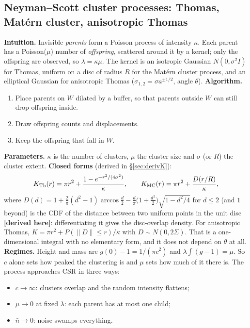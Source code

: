 \documentclass[10pt,a4paper]{article}
\newcommand{\derived}{\textcolor{green!45!black}{\textbf{[derived here]}}}
\newcommand{\nbar}{\bar n}
\begin{document}
\subsection{Neyman--Scott cluster processes: Thomas, Mat\'ern cluster, anisotropic Thomas}\label{sec:ns}
\textbf{Intuition.} Invisible \emph{parents} form a Poisson process of intensity $\kappa$. Each parent has a Poisson($\mu$) number of \emph{offspring}, scattered around it by a kernel; only the offspring are observed, so $\lambda=\kappa\mu$. The kernel is an isotropic Gaussian $N(0,\sigma^2I)$ for Thomas, uniform on a disc of radius $R$ for the Mat\'ern cluster process, and an elliptical Gaussian for anisotropic Thomas ($\sigma_{1,2}=\sigma a^{\pm1/2}$, angle $\theta$).
\textbf{Algorithm.}
\begin{enumerate}
  \item Place parents on $W$ dilated by a buffer, so that parents outside $W$ can still drop offspring inside.
  \item Draw offspring counts and displacements.
  \item Keep the offspring that fall in $W$.
\end{enumerate}
\textbf{Parameters.} $\kappa$ is the number of clusters, $\mu$ the cluster size and $\sigma$ (or $R$) the cluster extent.
\textbf{Closed forms} (derived in \S\ref{sec:derivK}):
\begin{equation}
K_{\rm Th}(r)=\pi r^2+\frac{1-e^{-r^2/(4\sigma^2)}}{\kappa},\qquad
K_{\rm MC}(r)=\pi r^2+\frac{D(r/R)}{\kappa},
\label{eq:Kns}
\end{equation}
where $D(d)=1+\tfrac{2}{\pi}(d^2-1)\arccos\tfrac d2-\tfrac d\pi\big(1+\tfrac{d^2}{2}\big)\sqrt{1-d^2/4}$ for $d\le2$ (and $1$ beyond) is the CDF of the distance between two uniform points in the unit disc \derived{}: differentiating it gives the disc-overlap density. For anisotropic Thomas, $K=\pi r^2+P(\|D\|\le r)/\kappa$ with $D\sim N(0,2\Sigma)$. That is a one-dimensional integral with no elementary form, and it does not depend on $\theta$ at all.
\textbf{Regimes.} Height and mass are $g(0)-1=1/(\pi c^2)$ and $\lambda\int(g-1)=\mu$. So $c$ alone sets how peaked the clustering is and $\mu$ sets how much of it there is. The process approaches CSR in three ways:
\begin{itemize}
  \item $c\to\infty$: clusters overlap and the random intensity flattens;
  \item $\mu\to0$ at fixed $\lambda$: each parent has at most one child;
  \item $\nbar\to0$: noise swamps everything.
\end{itemize}
\end{document}
